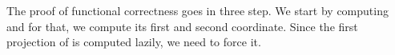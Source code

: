 The proof of functional correctness goes in three step.
We start by computing  and for that, we compute its first and second coordinate.
Since the first projection of  is computed lazily, we need to force it.

\begin{code}%
\>[0]\AgdaSpace{}%
\AgdaSymbol{:}\AgdaSpace{}%
\AgdaSymbol{(}\AgdaFunction{∏[}%
\>[68I]\AgdaSpace{}%
\AgdaSpace{}%
\AgdaSpace{}%
\AgdaSpace{}%
\AgdaSpace{}%
\AgdaSpace{}%
\AgdaSpace{}%
\AgdaSymbol{(}\AgdaSpace{}%
\AgdaSymbol{)}\AgdaSpace{}%
\AgdaFunction{]}\<%
\\
\>[.]\<[68I]%
\>[12]\AgdaSpace{}%
\AgdaSymbol{(}\AgdaSpace{}%
\AgdaOperator{\AgdaInductiveConstructor{,}}\AgdaSpace{}%
\AgdaSpace{}%
\AgdaOperator{\AgdaInductiveConstructor{,}}\AgdaSpace{}%
\AgdaSymbol{)}\AgdaSpace{}%
\AgdaSymbol{=}\AgdaSpace{}%
\<%
\\
%
\>[12]%
\>[85I]\AgdaSpace{}%
\AgdaSymbol{(}\AgdaSpace{}%
\AgdaSymbol{(}\AgdaSpace{}%
\AgdaSymbol{(}\AgdaSpace{}%
\AgdaOperator{\AgdaInductiveConstructor{,}}\AgdaSpace{}%
\AgdaSymbol{)))}\AgdaSpace{}%
\<%
\\
\>[.]\<[85I]%
\>[15]\<%
\\
%
\>[15]\AgdaSpace{}%
\AgdaSpace{}%
\AgdaSymbol{(}\AgdaSpace{}%
\AgdaSpace{}%
\AgdaSymbol{))}\<%
\\
\>[0]\AgdaSpace{}%
\AgdaSymbol{(}\AgdaSpace{}%
\AgdaOperator{\AgdaInductiveConstructor{,}}\AgdaSpace{}%
\AgdaSpace{}%
\AgdaSpace{}%
\AgdaOperator{\AgdaInductiveConstructor{,}}\AgdaSpace{}%
\AgdaSymbol{)}\AgdaSpace{}%
\AgdaSymbol{=}\AgdaSpace{}%
\<%
\\
\>[0]\AgdaSpace{}%
\AgdaSymbol{(}\AgdaSpace{}%
\AgdaOperator{\AgdaInductiveConstructor{,}}\AgdaSpace{}%
\AgdaSpace{}%
\AgdaSpace{}%
\AgdaSpace{}%
\AgdaOperator{\AgdaInductiveConstructor{,}}\AgdaSpace{}%
\AgdaSymbol{)}\AgdaSpace{}%

\end{code}

